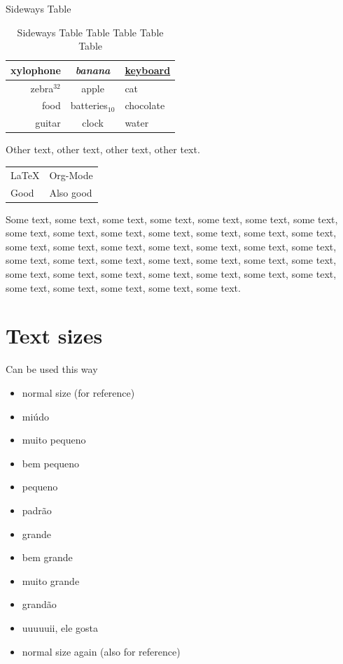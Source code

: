 \documentclass[a4paper,12pt]{article}
\begin{document}
\begin{table}
    Sideways Table \\

        \centering
        \begin{tabular}{r|c|l}
            \hline
            \textbf{xylophone} & \textit{banana} & \underline{keyboard} \\
            \hline
            zebra$^{32}$ & apple & cat \\
            \hline
            food & batteries$_{10}$ & chocolate \\
            guitar & clock & water
        \end{tabular}
        \caption{Sideways Table Table Table Table Table}
        \label{tab:sidewaystable}
\end{table}

\begin{table}
    \color{red} Other text, other text, other text, other text. \\

    \color{black}
    \begin{tabular}{l|l}
        \LaTeX & Org-Mode \\
        Good & Also good \\
    \end{tabular}
\end{table}

Some text, some text, some text, some text, some text, some text, some text, some text, some text, some text, some text, some text, some text, some text, some text, some text, some text, some text, some text, some text, some text, some text, some text, some text, some text, some text, some text, some text, some text, some text, some text, some text, some text, some text, some text, some text, some text, some text, some text, some text.

\section{Text sizes}
Can be used this way

\begin{itemize}
    \item{normal size (for reference)}
    \item{\tiny miúdo}
    \item{\scriptsize muito pequeno}
    \item{\footnotesize bem pequeno}
    \item{\small pequeno}
    \item{\normalsize padrão}
    \item{\large grande}
    \item{\Large bem grande}
    \item{\LARGE muito grande}
    \item{\huge grandão}
    \item{\Huge uuuuuii, ele gosta}
    \item{normal size again (also for reference)}
\end{itemize}
\end{document}
